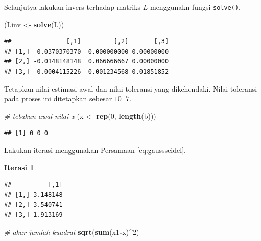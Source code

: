 \documentclass[]{book}
\newenvironment{Shaded}{\begin{snugshade}}{\end{snugshade}}
\newcommand{\CommentTok}[1]{\textcolor[rgb]{0.56,0.35,0.01}{\textit{#1}}}
\newcommand{\DecValTok}[1]{\textcolor[rgb]{0.00,0.00,0.81}{#1}}
\newcommand{\KeywordTok}[1]{\textcolor[rgb]{0.13,0.29,0.53}{\textbf{#1}}}
\newcommand{\NormalTok}[1]{#1}
\newcommand{\OperatorTok}[1]{\textcolor[rgb]{0.81,0.36,0.00}{\textbf{#1}}}
\newcommand{\StringTok}[1]{\textcolor[rgb]{0.31,0.60,0.02}{#1}}
\theoremstyle{definition}
\theoremstyle{definition}
\theoremstyle{definition}
\theoremstyle{remark}
\begin{document}
Selanjutya lakukan invers terhadap matriks \(L\) menggunakn fungsi \texttt{solve()}.

\begin{Shaded}
\begin{Highlighting}[]
\NormalTok{(Linv <-}\StringTok{ }\KeywordTok{solve}\NormalTok{(L))}
\end{Highlighting}
\end{Shaded}

\begin{verbatim}
##               [,1]         [,2]       [,3]
## [1,]  0.0370370370  0.000000000 0.00000000
## [2,] -0.0148148148  0.066666667 0.00000000
## [3,] -0.0004115226 -0.001234568 0.01851852
\end{verbatim}

Tetapkan nilai estimasi awal dan nilai toleransi yang dikehendaki. Nilai toleransi pada proses ini ditetapkan sebesar \(10^-7\).

\begin{Shaded}
\begin{Highlighting}[]
\CommentTok{# tebakan awal nilai x}
\NormalTok{(x <-}\StringTok{ }\KeywordTok{rep}\NormalTok{(}\DecValTok{0}\NormalTok{, }\KeywordTok{length}\NormalTok{(b)))}
\end{Highlighting}
\end{Shaded}

\begin{verbatim}
## [1] 0 0 0
\end{verbatim}

Lakukan iterasi menggunakan Persamaan \eqref{eq:gaussseidel}.

\textbf{Iterasi 1}

\begin{Shaded}
\end{Shaded}

\begin{verbatim}
##          [,1]
## [1,] 3.148148
## [2,] 3.540741
## [3,] 1.913169
\end{verbatim}

\begin{Shaded}
\begin{Highlighting}[]
\CommentTok{# akar jumlah kuadrat}
\KeywordTok{sqrt}\NormalTok{(}\KeywordTok{sum}\NormalTok{(x1}\OperatorTok{-}\NormalTok{x)}\OperatorTok{^}\DecValTok{2}\NormalTok{)}
\end{Highlighting}
\end{Shaded}
\end{document}
